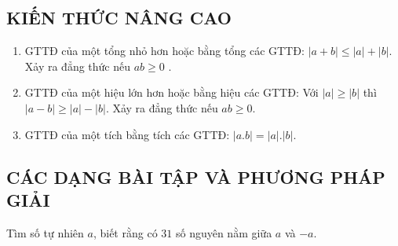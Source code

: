 \subsection{KIẾN THỨC NÂNG CAO}
	\begin{enumerate}
		\item GTTĐ của một tổng nhỏ hơn hoặc bằng tổng các GTTĐ: $\left| a+b\right|\le \left| a\right|+\left| b\right|$. Xảy ra đẳng thức nếu $ab\ge 0$ .
		\item GTTĐ của một hiệu lớn hơn hoặc bằng hiệu các GTTĐ: 
		Với $\left| a\right|\ge \left| b\right|$ thì $\left| a-b\right|\ge \left| a\right|-\left| b\right|$. Xảy ra đẳng thức nếu $ab\ge 0$.
		\item GTTĐ của một tích bằng tích các GTTĐ: $\left| a.b\right|=\left| a\right|.\left| b\right|$.
	\end{enumerate}
\subsection{CÁC DẠNG BÀI TẬP VÀ PHƯƠNG PHÁP GIẢI}
	\begin{vd}%
		Tìm số tự nhiên $a$, biết rằng có $31$ số nguyên nằm giữa $a$ và $-a$.	
	\end{vd}

